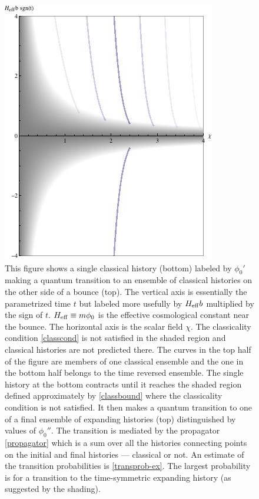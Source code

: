 \documentclass[prd,floats,superscriptaddress,eqsecnum,floatfix,nofootinbib,12pt]{revtex4}
\def\p0{\phi_0}
\def\j2{}
\def\p0{\phi_0}
\begin{document}
{{{{%
\begin{figure}[t]
\includegraphics[width=4.in]{qtransplt200.jpg}
\caption{This figure shows a single classical history (bottom)  labeled by $\p0'$ making a quantum transition to an ensemble of classical histories on the other side of a bounce (top).{\j2 The vertical axis is essentially the parametrized time $t$ but labeled more usefully by $H_{\rm eff}b$  multiplied by the sign of $t$. $H_{\rm eff}\equiv m\p0$ is the effective cosmological constant near the bounce. The horizontal axis  is the scalar field $\chi$.}{\j2 The classicality condition \eqref{classcond} is not satisfied in the shaded region and classical histories are not predicted there. The curves in the top half of the figure are members of one classical ensemble and the one in the bottom half belongs to the time reversed ensemble. }The single history at the bottom  contracts until it reaches the shaded region defined approximately by \eqref{classbound} where the classicality condition is not satisfied. It then makes a quantum transition to one of a final ensemble of expanding histories (top)  distinguished by values of  $\p0''$.  The transition is mediated by the propagator \eqref{propagator} which is a sum over all the histories connecting points on the initial and final histories --- classical or not. An estimate of the transition probabilities is \eqref{transprob-ex}. The largest probability is for a transition to the time-symmetric expanding history (as suggested by the shading).} 
\label{transition}
\end{figure}

}}}}
\end{document}
